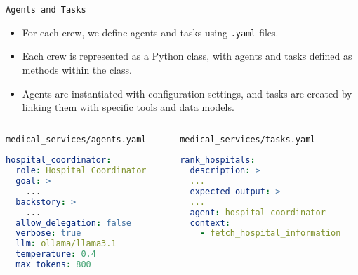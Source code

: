 \begin{frame}[fragile]{\texttt{Agents and Tasks}}
    \begin{itemize}
        \item For each crew, we define agents and tasks using \texttt{.yaml} files.
        \item Each crew is represented as a Python class, with agents and tasks defined as methods within the class.
        \item Agents are instantiated with configuration settings, and tasks are created by linking them with specific tools and data models.
    \end{itemize}
      \begin{columns}
        \begin{column}{0.48\textwidth} %
            \centering%
  \texttt{medical\_services/agents.yaml}
            \begin{lstlisting}[language=yaml]
hospital_coordinator:
  role: Hospital Coordinator
  goal: >
    ...
  backstory: >
    ...
  allow_delegation: false
  verbose: true
  llm: ollama/llama3.1
  temperature: 0.4
  max_tokens: 800

            \end{lstlisting}
        \end{column}
        \begin{column}{0.48\textwidth} %
            \centering
              \texttt{medical\_services/tasks.yaml}
            \begin{lstlisting}[language=yaml]
rank_hospitals:
  description: >
  ...
  expected_output: >
  ...
  agent: hospital_coordinator
  context:
    - fetch_hospital_information
            \end{lstlisting}
        \end{column}
      \end{columns}
\end{frame}